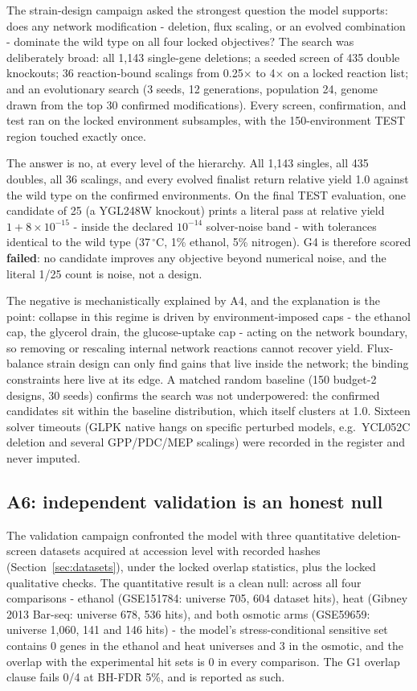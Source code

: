 \documentclass[12pt]{article}
\begin{document}
The strain-design campaign asked the strongest question the model
supports: does any network modification - deletion, flux scaling, or
an evolved combination - dominate the wild type on all four locked
objectives? The search was deliberately broad: all 1{,}143 single-gene
deletions; a seeded screen of 435 double knockouts; 36 reaction-bound
scalings from 0.25$\times$ to 4$\times$ on a locked reaction list; and
an evolutionary search (3 seeds, 12 generations, population 24, genome
drawn from the top 30 confirmed modifications). Every screen,
confirmation, and test ran on the locked environment subsamples, with
the 150-environment TEST region touched exactly once.

The answer is no, at every level of the hierarchy. All 1{,}143 singles,
all 435 doubles, all 36 scalings, and every evolved finalist return
relative yield 1.0 against the wild type on the confirmed environments.
On the final TEST evaluation, one candidate of 25 (a YGL248W knockout)
prints a literal pass at relative yield $1+8\times10^{-15}$ - inside the
declared $10^{-14}$ solver-noise band - with tolerances identical to the
wild type (37\,$^{\circ}$C, 1\% ethanol, 5\% nitrogen). G4 is therefore
scored \textbf{failed}: no candidate improves any objective beyond
numerical noise, and the literal 1/25 count is noise, not a design.

The negative is mechanistically explained by A4, and the explanation is
the point: collapse in this regime is driven by environment-imposed
caps - the ethanol cap, the glycerol drain, the glucose-uptake cap -
acting on the network boundary, so removing or rescaling internal
network reactions cannot recover yield. Flux-balance strain design can
only find gains that live inside the network; the binding constraints
here live at its edge. A matched random baseline (150 budget-2 designs,
30 seeds) confirms the search was not underpowered: the confirmed
candidates sit within the baseline distribution, which itself clusters
at 1.0. Sixteen solver timeouts (GLPK native hangs on specific perturbed
models, e.g.\ YCL052C deletion and several GPP/PDC/MEP scalings) were
recorded in the register and never imputed.

\subsection{A6: independent validation is an honest null}
\label{sec:a6}

The validation campaign confronted the model with three quantitative
deletion-screen datasets acquired at accession level with recorded
hashes (Section~\ref{sec:datasets}), under the locked overlap
statistics, plus the locked qualitative checks. The quantitative result
is a clean null: across all four comparisons - ethanol
(GSE151784: universe 705, 604 dataset hits), heat (Gibney 2013 Bar-seq:
universe 678, 536 hits), and both osmotic arms (GSE59659: universe
1{,}060, 141 and 146 hits) - the model's stress-conditional sensitive
set contains 0 genes in the ethanol and heat universes and 3 in the
osmotic, and the overlap with the experimental hit sets is 0 in every
comparison. The G1 overlap clause fails 0/4 at BH-FDR 5\%, and is
reported as such.
\end{document}
